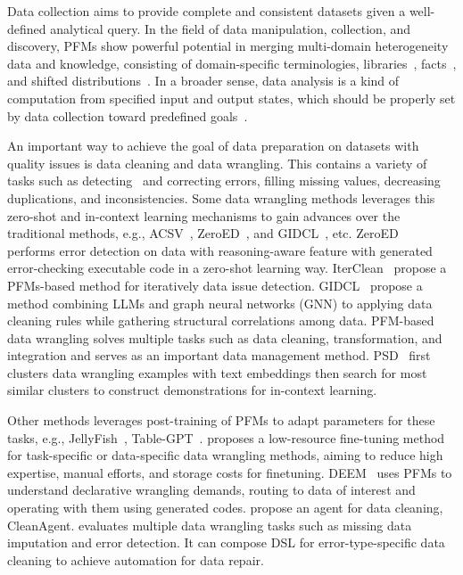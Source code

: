 Data collection aims to provide complete and consistent datasets given a well-defined analytical query. In the field of data manipulation, collection, and discovery, PFMs show powerful potential in merging multi-domain heterogeneity data and knowledge, consisting of domain-specific terminologies, libraries~\cite{Ellis2020DreamCoderGG}, facts~\cite{Tang2024WorldCoderAM}, and shifted distributions~\cite{sordoni2024joint}. In a broader sense, data analysis is a kind of computation from specified input and output states, which should be properly set by data collection toward predefined goals~\cite{turing1936computable}.
  
  
An important way to achieve the goal of data preparation on datasets with quality issues is data cleaning and data wrangling. This contains a variety of tasks such as detecting~\cite{ZeroED} and correcting errors, filling missing values, decreasing duplications, and inconsistencies. Some data wrangling methods leverages this zero-shot and in-context learning mechanisms to gain advances over the traditional methods, e.g., ACSV~\cite{ACSV}, ZeroED~\cite{ZeroED}, and  GIDCL~\cite{YanWWML24}, etc. ZeroED~\cite{ZeroED} performs error detection on data with reasoning-aware feature with generated error-checking executable code in a zero-shot learning way. IterClean~\cite{ni2024iterclean} propose a PFMs-based method for iteratively data issue detection. GIDCL~\cite{YanWWML24} propose a method combining LLMs and graph neural networks (GNN) to applying data cleaning rules while gathering structural correlations among data. PFM-based data wrangling solves multiple tasks such as data cleaning, transformation, and integration and serves as an important data management method. PSD~\cite{huh2023pool} first clusters data wrangling examples with text embeddings then search for most similar clusters to construct demonstrations for in-context learning. 

Other methods leverages post-training of PFMs to adapt parameters for these tasks, e.g., JellyFish~\cite{zhang2024jellyfish}, Table-GPT~\cite{li2024table}. \cite{vos2022towards} proposes a low-resource fine-tuning method for task-specific or data-specific data wrangling methods, aiming to reduce high expertise, manual efforts, and storage costs for finetuning. DEEM~\cite{deem} uses PFMs to understand declarative wrangling demands, routing to data of interest and operating with them using generated codes. \cite{qi2024cleanagent} propose an agent for data cleaning, CleanAgent. \cite{FMwrangling} evaluates multiple data wrangling tasks such as missing data imputation and error detection. It can compose DSL for error-type-specific data cleaning to achieve automation for data repair.
  
